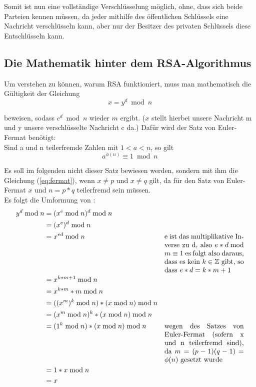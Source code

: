 \documentclass[12pt,a4paper]{scrartcl}
\begin{document}
	Somit ist nun eine vollständige Verschlüsselung möglich, ohne, dass sich beide Parteien kennen müssen, da jeder mithilfe des öffentlichen Schlüssels eine Nachricht verschlüsseln kann, aber nur der Besitzer des privaten Schlüssels diese Entschlüsseln kann.

	\subsection{Die Mathematik hinter dem RSA-Algorithmus}
	Um verstehen zu können, warum RSA funktioniert, muss man mathematisch die Gültigkeit der Gleichung
	\begin{equation}\label{eq:fermat}
 x = y^d \bmod n
 \end{equation}

 beweisen, sodass $c^d \bmod n$ wieder $m$ ergibt. ($x$ stellt hierbei unsere Nachricht m und y unsere verschlüsselte Nachricht c da.) Dafür wird der Satz von Euler-Fermat benötigt: \\
	Sind a und n teilerfremde Zahlen mit $1 < a < n$, so gilt
	$$a^{\phi (n)} \equiv 1 \bmod n $$
	
	Es soll im folgenden nicht dieser Satz bewiesen werden, sondern mit ihm die Gleichung (\ref{eq:fermat}), wenn $x \neq p$ und $x \neq q$ gilt, da für den Satz von Euler-Fermat $x$ und $n = p*q$ teilerfremd sein müssen. \\
	
	Es folgt die Umformung von \citeauthor{frauenhofer}:
	\begin{align*}
	 y^d \bmod n & = (x^e \bmod n)^d \bmod n & \\
	 & = (x^e)^d \bmod n &\\
 	 & =x^{ed} \bmod n &  \parbox[t]{4cm}{e ist das multiplikative Inverse zu d, also $e * d \bmod m \equiv 1$ es folgt also daraus, dass es kein $k \in \mathbb{Z}$ gibt, so dass $e*d=k*m+1$}\\
 	 & =x^{k*m+1} \bmod n & \\
 	 & =x^{k*m}*m \bmod n & \\
 	 & =((x^m)^k \bmod n) * (x \bmod n) \bmod n & \\
 	 & =(x^m \bmod n)^k * (x \bmod n) \bmod n & \\
 	 & =(1^k \bmod n) * (x \bmod n) \bmod n &  \parbox[t]{4cm}{wegen des Satzes von Euler-Fermat (sofern x und n teilerfremd sind), da $m = (p - 1)(q - 1) = \phi(n)$ gesetzt wurde} \\
 	 & = 1 * x \bmod n & \\
 	 & = x &
 	\end{align*} \cite[S.15]{frauenhofer}
\end{document}
